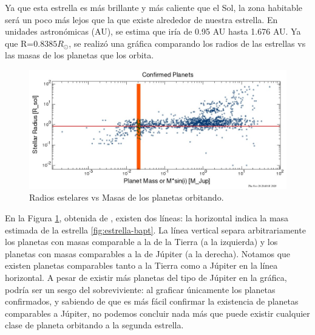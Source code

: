 Ya que esta estrella es más brillante y más caliente que el Sol, la zona habitable será un poco más lejos que la que existe alrededor de nuestra estrella. En unidades astronómicas (AU), se estima que iría de 0.95 AU hasta 1.676 AU. 
Ya que R=$0.8385 R_\odot$, se realizó una gráfica comparando los radios de las estrellas vs las masas de los planetas que los orbita.
\begin{figure}[ht]
    \centering
    \includegraphics[scale=0.35]{Secciones/Radios.jpg}
    \caption{Radios estelares vs Masas de los planetas orbitando. }
    \label{fig:radios}
\end{figure}
En la Figura \ref{fig:radios}, obtenida de \cite{iceplotter_2020}, existen dos líneas: la horizontal indica la masa estimada de la estrella \ref{fig:estrella-bapt}. La línea vertical separa arbitrariamente los planetas con masas comparable a la de la Tierra (a la izquierda) y los planetas con masas comparables a la de Júpiter (a la derecha). Notamos que existen planetas comparables tanto a la Tierra como a Júpiter en la línea horizontal. A pesar de existir más planetas del tipo de Júpiter en la gráfica, podría ser un sesgo del sobreviviente: al graficar únicamente los planetas confirmados, y sabiendo de que es más fácil confirmar la existencia de planetas comparables a Júpiter, no podemos concluir nada más que puede existir cualquier clase de planeta orbitando a la segunda estrella.




